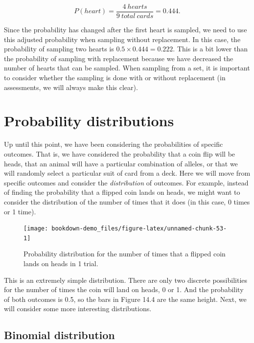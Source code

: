 \documentclass[
]{scrbook}
\begin{document}
\[P(heart) = \frac{4\:hearts}{9\:total\:cards} = 0.444.\]

Since the probability has changed after the first heart is sampled, we need to use this adjusted probability when sampling without replacement.
In this case, the probability of sampling two hearts is \(0.5 \times 0.444 = 0.222\).
This is a bit lower than the probability of sampling with replacement because we have decreased the number of hearts that can be sampled.
When sampling from a set, it is important to consider whether the sampling is done with or without replacement (in assessments, we will always make this clear).

\hypertarget{probability-distributions}{%
\section{Probability distributions}\label{probability-distributions}}

Up until this point, we have been considering the probabilities of specific outcomes.
That is, we have considered the probability that a coin flip will be heads, that an animal will have a particular combination of alleles, or that we will randomly select a particular suit of card from a deck.
Here we will move from specific outcomes and consider the \emph{distribution} of outcomes.
For example, instead of finding the probability that a flipped coin lands on heads, we might want to consider the distribution of the number of times that it does (in this case, 0 times or 1 time).

\begin{figure}
\texttt{[image: bookdown-demo\_files/figure-latex/unnamed-chunk-53-1]} \caption{Probability distribution for the number of times that a flipped coin lands on heads in 1 trial.}\label{fig:unnamed-chunk-53}
\end{figure}

This is an extremely simple distribution.
There are only two discrete possibilities for the number of times the coin will land on heads, 0 or 1.
And the probability of both outcomes is 0.5, so the bars in Figure 14.4 are the same height.
Next, we will consider some more interesting distributions.

\hypertarget{binomial-distribution}{%
\subsection{Binomial distribution}\label{binomial-distribution}}
\end{document}
